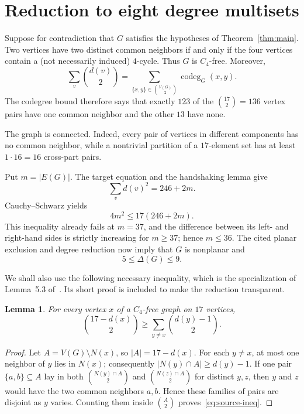 \documentclass[11pt]{article}
\newtheorem{lemma}[theorem]{Lemma}
\newcommand{\codeg}{\operatorname{codeg}}
\begin{document}
\section{Reduction to eight degree multisets}

Suppose for contradiction that $G$ satisfies the hypotheses of
Theorem~\ref{thm:main}.  Two vertices have two distinct common neighbors if
and only if the four vertices contain a (not necessarily induced) $4$-cycle.
Thus $G$ is $C_4$-free.  Moreover,
\[
 \sum_{v}\binom{d(v)}2
   =\sum_{\{x,y\}\in\binom{V(G)}2}\codeg_G(x,y).
\]
The codegree bound therefore says that exactly $123$ of the
$\binom{17}{2}=136$ vertex pairs have one common neighbor and the other
$13$ have none.

The graph is connected.  Indeed, every pair of vertices in different
components has no common neighbor, while a nontrivial partition of a
$17$-element set has at least $1\cdot16=16$ cross-part pairs.

Put $m=|E(G)|$.  The target equation and the handshaking lemma give
\[
 \sum_v d(v)^2=246+2m.
\]
Cauchy--Schwarz yields
\[
 4m^2\leq17(246+2m).
\]
This inequality already fails at $m=37$, and the difference between its
left- and right-hand sides is strictly increasing for $m\geq37$; hence
$m\leq36$.  The cited planar exclusion and degree reduction now imply that
$G$ is nonplanar and
\begin{equation}\label{eq:delta-range}
 5\leq\Delta(G)\leq9.
\end{equation}

We shall also use the following necessary inequality, which is the
specialization of Lemma~5.3 of~\cite{AscoleseEtAl2026}.  Its short proof is
included to make the reduction transparent.

\begin{lemma}\label{lem:source-ineq}
For every vertex $x$ of a $C_4$-free graph on $17$ vertices,
\begin{equation}\label{eq:source-ineq}
 \binom{17-d(x)}2\geq
 \sum_{y\ne x}\binom{d(y)-1}{2}.
\end{equation}
\end{lemma}

\begin{proof}
Let $A=V(G)\setminus N(x)$, so $|A|=17-d(x)$.  For each $y\ne x$, at most
one neighbor of $y$ lies in $N(x)$; consequently
$|N(y)\cap A|\geq d(y)-1$.  If one pair $\{a,b\}\subseteq A$ lay in both
$\binom{N(y)\cap A}{2}$ and $\binom{N(z)\cap A}{2}$ for distinct $y,z$,
then $y$ and $z$ would have the two common neighbors $a,b$.  Hence these
families of pairs are disjoint as $y$ varies.  Counting them inside
$\binom A2$ proves~\eqref{eq:source-ineq}.
\end{proof}
\end{document}
